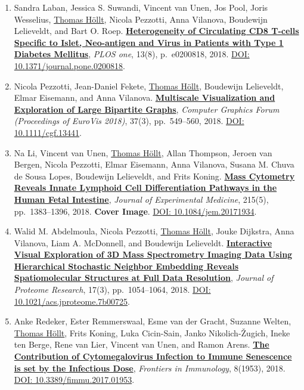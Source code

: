 \documentclass[10pt,a4paper,roman,final]{moderncv}
\newcommand*\highlightauthor[1]{\underline{#1}}
\begin{document}
\begin{enumerate}[leftmargin=0cm,start=2]
\item
Sandra Laban, Jessica S. Suwandi, Vincent van Unen, Jos Pool, Joris Wesselius, \highlightauthor{Thomas Höllt}, Nicola Pezzotti, Anna Vilanova, Boudewijn Lelieveldt, and Bart O. Roep.
\href{https://www.thomashollt.com/publications/2018_plos_circulating_t_cells/}{\textbf{Heterogeneity of Circulating CD8 T-cells Specific to Islet, Neo-antigen and Virus in Patients with Type 1 Diabetes Mellitus}},
\emph{PLOS one}, 13(8), p.~e0200818,
2018.
\href{https://doi.org/10.1371/journal.pone.0200818}{DOI: 10.1371/\allowbreak journal.pone.0200818}.


\item
Nicola Pezzotti, Jean-Daniel Fekete, \highlightauthor{Thomas Höllt}, Boudewijn Lelieveldt, Elmar Eisemann, and Anna Vilanova.
\href{https://www.thomashollt.com/publications/2018_eurovis_waowvis/}{\textbf{Multiscale Visualization and Exploration of Large Bipartite Graphs}},
\emph{Computer Graphics Forum (Proceedings of EuroVis 2018)}, 37(3), pp.~549--560,
2018.
\href{https://doi.org/10.1111/cgf.13441}{DOI: 10.1111/\allowbreak cgf.13441}.


\item
Na Li, Vincent van Unen, \highlightauthor{Thomas Höllt}, Allan Thompson, Jeroen van Bergen, Nicola Pezzotti, Elmar Eisemann, Anna Vilanova, Susana M. Chuva de Sousa Lopes, Boudewijn Lelieveldt, and Frits Koning.
\href{https://www.thomashollt.com/publications/2018_exp_medicine/}{\textbf{Mass Cytometry Reveals Innate Lymphoid Cell Differentiation Pathways in the Human Fetal Intestine}},
\emph{Journal of Experimental Medicine}, 215(5), pp.~1383--1396,
2018.
\textbf{Cover Image}.
\href{https://doi.org/10.1084/jem.20171934}{DOI: 10.1084/\allowbreak jem.20171934}.


\item
Walid M. Abdelmoula, Nicola Pezzotti, \highlightauthor{Thomas Höllt}, Jouke Dijkstra, Anna Vilanova, Liam A. McDonnell, and Boudewijn Lelieveldt.
\href{https://www.thomashollt.com/publications/2018_proteome_research/}{\textbf{Interactive Visual Exploration of 3D Mass Spectrometry Imaging Data Using Hierarchical Stochastic Neighbor Embedding Reveals Spatiomolecular Structures at Full Data Resolution}},
\emph{Journal of Proteome Research}, 17(3), pp.~1054--1064,
2018.
\href{https://doi.org/10.1021/acs.jproteome.7b00725}{DOI: 10.1021/\allowbreak acs.jproteome.7b00725}.


\item
Anke Redeker, Ester Remmerswaal, Esme van der Gracht, Suzanne Welten, \highlightauthor{Thomas Höllt}, Frits Koning, Luka Cicin-Sain, Janko Nikolich-Žugich, Ineke ten Berge, Rene van Lier, Vincent van Unen, and Ramon Arens.
\href{https://www.thomashollt.com/publications/2018_front_immunol_cytomegalovirus/}{\textbf{The Contribution of Cytomegalovirus Infection to Immune Senescence is set by the Infectious Dose}},
\emph{Frontiers in Immunology}, 8(1953),
2018.
\href{https://doi.org/10.3389/fimmu.2017.01953}{DOI: 10.3389/\allowbreak fimmu.2017.01953}.



\end{enumerate}
\end{document}
